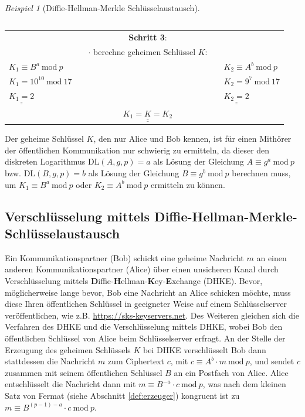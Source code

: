 \documentclass[
  a4paper,
  11pt,
]{scrartcl}
\theoremstyle{plain}
\theoremstyle{definition}
\theoremstyle{remark}
\newtheorem{beispiel}{Beispiel}
\newcommand{\Mod}[1]{\ \mathrm{mod}\ #1}
\def\doubleunderline#1{\underline{\underline{#1}}} %
\begin{document}
\begin{beispiel}[Diffie-Hellman-Merkle Schlüsselaustausch]
\begin{center}
\begin{tabularx}{\textwidth}{lXcXl}
    \end{tabularx}
    \begin{tabularx}{\textwidth}{lXcXl}
      & & \textbf{Schritt 3}: & & \\
      & & $\cdot$ berechne geheimen Schlüssel $K$: & & \\
      $K_1 \equiv B^a \Mod{p}$ & & & & $K_2 \equiv A^b \Mod{p}$\\
      $K_1 = 10^{10} \Mod{17}$ & & & & $K_2 = 9^7 \Mod{17}$\\
      $\doubleunderline{K_1 = 2}$ & & & & $\doubleunderline{K_2 = 2}$\\
      & & $\doubleunderline{K_1 = K = K_2}$ & &
    \end{tabularx}
  \end{center}
  Der geheime Schlüssel $K$, den nur Alice und Bob kennen, ist für einen
  Mithörer der öffentlichen Kommunikation nur schwierig zu ermitteln, da dieser
  den diskreten Logarithmus $\text{DL}(A,g,p) = a$ als Lösung der Gleichung
  $A \equiv g^a \Mod{p}$ bzw. $\text{DL}(B,g,p) = b$ als Lösung der Gleichung
  $B \equiv g^b \Mod{p}$ berechnen muss, um $K_1 \equiv B^a \Mod{p}$ oder
  $K_2 \equiv A^b \Mod{p}$ ermitteln zu können.
\end{beispiel}

\subsection{Verschlüsselung mittels Diffie-Hellman-Merkle-Schlüsselaustausch}
\label{sub:enc_with_dhke}
Ein Kommunikationspartner (Bob) schickt eine geheime Nachricht $m$ an einen
anderen Kommunikationspartner (Alice) über einen unsicheren Kanal durch
Verschlüsselung mittels
\textbf{D}iffie-\textbf{H}ellman-\textbf{K}ey-\textbf{E}xchange (DHKE). Bevor,
möglicherweise lange bevor, Bob eine Nachricht an Alice schicken möchte, muss
diese Ihren öffentlichen Schlüssel in geeigneter Weise auf einem Schlüsselserver
veröffentlichen, wie z.B. \url{https://sks-keyservers.net}. Des Weiteren
gleichen sich die Verfahren des DHKE und die Verschlüsselung mittels DHKE, wobei
Bob den öffentlichen Schlüssel von Alice beim Schlüsselserver erfragt. An der
Stelle der Erzeugung des geheimen Schlüssels $K$ bei DHKE verschlüsselt Bob dann
stattdessen die Nachricht $m$ zum Ciphertext $c$, mit $c \equiv A^b \cdot m
\Mod{p}$, und sendet $c$ zusammen mit seinem öffentlichen Schlüssel $B$ an ein
Postfach von Alice. Alice entschlüsselt die Nachricht dann mit $m \equiv
B^{-a}\cdot c  \Mod{p}$, was nach dem kleinen Satz von Fermat (siehe Abschnitt
\ref{def:erzeuger}) kongruent ist zu $m \equiv B^{(p-1)-a}\cdot c \Mod{p}$.
\end{document}
